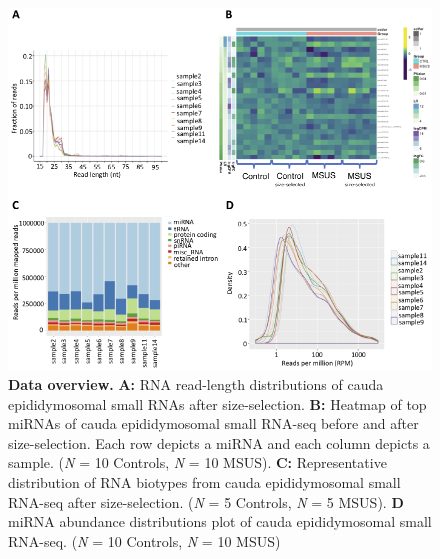 \documentclass[12pt,twoside]{reedthesis}
\begin{document}
\begin{figure}[htbp]

{\centering \includegraphics{thesis_files/figure-latex/es2-1} 

}

\caption[Data overview]{\textbf{Data overview.} \newline \textbf{A:} RNA read-length distributions of cauda epididymosomal small RNAs after size-selection. \newline \textbf{B:} Heatmap of top miRNAs of cauda epididymosomal small RNA-seq before and after size-selection. Each row depicts a miRNA and each column depicts a sample. (\emph{N} = 10 Controls, \emph{N} = 10 MSUS). \newline \textbf{C:} Representative distribution of RNA biotypes from cauda epididymosomal small RNA-seq after size-selection. (\emph{N} = 5 Controls, \emph{N} = 5 MSUS). \newline \textbf{D} miRNA abundance distributions plot of cauda epididymosomal small RNA-seq. (\emph{N} = 10 Controls, \emph{N} = 10 MSUS)}\label{fig:es2}
\end{figure}
\end{document}
